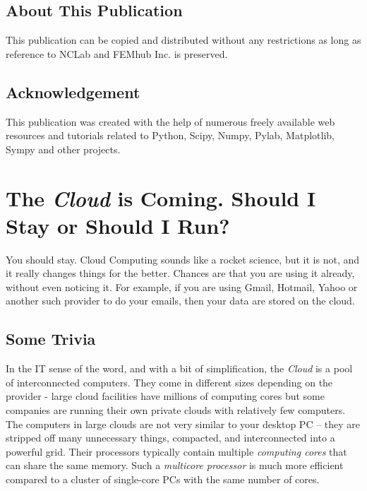 \documentclass[article,A4,12pt]{llncs}
\begin{document}
\subsection*{About This Publication}
This publication can be copied and distributed without any restrictions
as long as reference to NCLab and FEMhub Inc. is preserved.

\subsection*{Acknowledgement}
This publication was created with the help of numerous freely 
available web resources and tutorials related to Python, Scipy,
Numpy, Pylab, Matplotlib, Sympy and other projects.

\normalsize

\newpage
\setcounter{tocdepth}{2}
\tableofcontents

\newpage

\pagestyle{plain}
\setcounter{page}{1}

\section{The {\em Cloud} is Coming. Should I Stay or Should I Run?}

You should stay. Cloud Computing sounds like a rocket science, but it is not,
and it really changes things for the better. Chances are that you are using 
it already, without even noticing it. For example, if you are using Gmail, 
Hotmail, Yahoo or another such provider to do your emails, then your data are 
stored on the cloud. 

\subsection{Some Trivia}

In the IT sense of the word, and with a bit of simplification, the {\em Cloud} 
is a pool of interconnected computers. They come in different sizes depending on the provider - 
large cloud facilities have millions of computing cores but some companies are running 
their own private clouds with relatively few computers. The computers in large clouds
are not very similar to your desktop PC -- they are stripped off many unnecessary 
things, compacted, and interconnected into a powerful grid. Their processors 
typically contain multiple {\em computing cores} that can share the same memory.
Such a {\em multicore processor} is much more efficient compared to a cluster 
of single-core PCs with the same number of cores.
\end{document}
